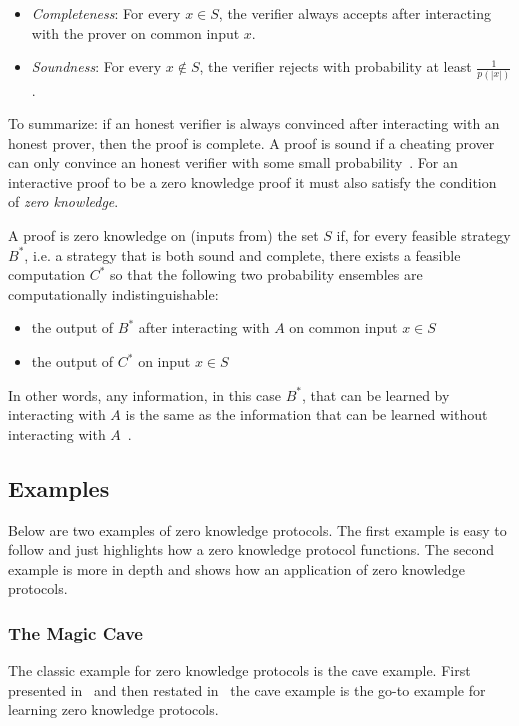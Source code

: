 \documentclass{sig-alternate}
\begin{document}
	\begin{itemize}
		\item \textit{Completeness}: For every $ x \in S$, the verifier always
		accepts after interacting with the prover on common input $x$.
			
		\item \textit{Soundness}: For every $x \notin S$, the verifier		
		rejects with probability at least $\frac{1}{p(|x|)}$.
	\end{itemize}
				
	To summarize: if an honest verifier is always convinced after interacting with
	an honest prover, then the proof is complete. A proof is sound if a cheating
	prover can only convince an honest verifier with some small probability~\cite{Survey}.	
	For an interactive proof to be a zero knowledge proof it must also
	satisfy the condition of \textit{zero knowledge}.	
		
	A proof is zero knowledge on (inputs from) the set $S$ if, for every feasible
	strategy $B^{*}$, i.e. a strategy that is both sound and complete,
	there exists a feasible computation $C^{*}$ so that the
	following two probability ensembles are computationally indistinguishable:
			
	\begin{itemize}
		\item the output of $B^{*}$ after interacting with $A$ on common input
		$x \in S$
				
		\item the output of $C^{*}$ on input $x \in S$
	\end{itemize}						
			
	In other words, any information, in this case $B^{*}$, that can be learned by
	interacting with $A$ is the same as the information that can be learned 
	without interacting with $A$~\cite{Survey}.

	\subsection{Examples}
	
	Below are two examples of zero knowledge protocols. The first
	example is easy to follow and just highlights how a zero knowledge
	protocol functions. The second example is more in depth and shows
	how an application of zero knowledge protocols.
	
	\subsubsection{The Magic Cave}
	The classic example for zero knowledge protocols is the cave example.
	First presented in~\cite{Children:1987} and then restated
	in~\cite{Survey} the cave example is the go-to example for learning
	zero knowledge protocols.
\end{document}
